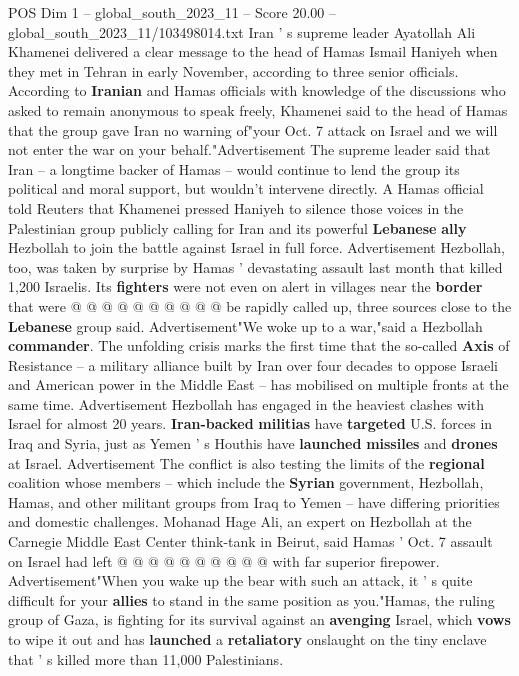 \begin{textsample}{POS Dim 1 – global\_south\_2023\_11 – Score 20.00 – global\_south\_2023\_11/103498014.txt}  \label{ex:f1_pos_223}
Iran ' s supreme leader Ayatollah Ali Khamenei delivered a clear message to the head of Hamas Ismail Haniyeh when they met in Tehran in early November, according to three senior officials.
According to \textbf{Iranian} and Hamas officials with knowledge of the discussions who asked to remain anonymous to speak freely, Khamenei said to the head of Hamas that the group gave Iran no warning of"your Oct. 7 attack on Israel and we will not enter the war on your behalf."Advertisement The supreme leader said that Iran -- a longtime backer of Hamas -- would continue to lend the group its political and moral support, but wouldn't intervene directly.
A Hamas official told Reuters that Khamenei pressed Haniyeh to silence those voices in the Palestinian group publicly calling for Iran and its powerful \textbf{Lebanese} \textbf{ally} Hezbollah to join the battle against Israel in full force.
Advertisement Hezbollah, too, was taken by surprise by Hamas ' devastating assault last month that killed 1,200 Israelis.
Its \textbf{fighters} were not even on alert in villages near the \textbf{border} that were @ @ @ @ @ @ @ @ @ @ be rapidly called up, three sources close to the \textbf{Lebanese} group said.
Advertisement"We woke up to a war,"said a Hezbollah \textbf{commander}.
The unfolding crisis marks the first time that the so-called \textbf{Axis} of Resistance -- a military alliance built by Iran over four decades to oppose Israeli and American power in the Middle East -- has mobilised on multiple fronts at the same time.
Advertisement Hezbollah has engaged in the heaviest clashes with Israel for almost 20 years. \textbf{Iran-backed} \textbf{militias} have \textbf{targeted} U.S. forces in Iraq and Syria, just as Yemen ' s Houthis have \textbf{launched} \textbf{missiles} and \textbf{drones} at Israel.
Advertisement The conflict is also testing the limits of the \textbf{regional} coalition whose members -- which include the \textbf{Syrian} government, Hezbollah, Hamas, and other militant groups from Iraq to Yemen -- have differing priorities and domestic challenges.
Mohanad Hage Ali, an expert on Hezbollah at the Carnegie Middle East Center think-tank in Beirut, said Hamas ' Oct. 7 assault on Israel had left @ @ @ @ @ @ @ @ @ @ with far superior firepower.
Advertisement"When you wake up the bear with such an attack, it ' s quite difficult for your \textbf{allies} to stand in the same position as you."Hamas, the ruling group of Gaza, is fighting for its survival against an \textbf{avenging} Israel, which \textbf{vows} to wipe it out and has \textbf{launched} a \textbf{retaliatory} onslaught on the tiny enclave that ' s killed more than 11,000 Palestinians.

\end{textsample}
